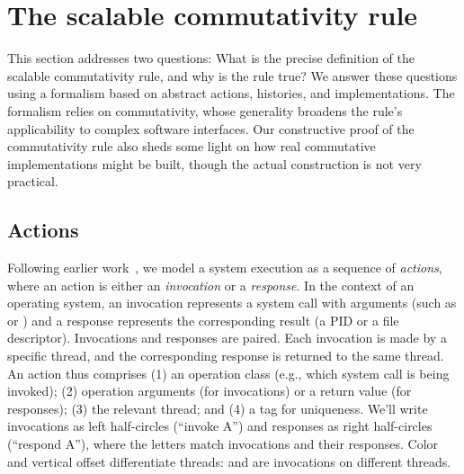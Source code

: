 
\section{The scalable commutativity rule}
\label{sec:rule}

This section addresses two questions: What is the precise
definition of the scalable commutativity rule, and why is the rule true?
%
We answer these questions using a formalism based on abstract actions, histories,
and implementations.
%
The formalism relies on \SIM commutativity, whose generality broadens
the rule's applicability to complex software interfaces.
%
Our constructive proof of the commutativity rule
also sheds some light on how real commutative implementations might be
built, though the actual construction is not very practical.



\subsection{Actions}

Following earlier work~\cite{herlihy:linearizability}, 
we model a system execution
as a sequence of \emph{actions}, where an action is either an
\emph{invocation} or a \emph{response}.
%
In the context of an operating system, an invocation represents a system
call with arguments (such as  or ) and a
response represents the corresponding result (a PID or a file
descriptor).
%
Invocations and responses are paired. Each invocation is made by a
specific thread, and the corresponding response is returned to the same
thread.
%
An action thus comprises (1) an operation class (e.g., which system
call is being invoked); (2) operation arguments (for invocations) or
a return value (for responses); (3) the relevant thread;
and (4) a tag for uniqueness.
%
We'll write invocations as left half-circles 
(``invoke A'') and responses as right half-circles
 (``respond A''), where the letters match
invocations and their responses.
%
Color and vertical offset differentiate threads:
 and  are invocations on
different threads.

\def\historyexample{%
\scpi{A}{1}
\scpi{B}{3}
\scpi{C}{2}
\scpr{A}{1}
\scpr{C}{2}
\scpr{B}{3}
\scpi{D}{1}
\scpr{D}{1}
\scpi{E}{3}
\scpr{E}{3}
\scpi{F}{2}
\scpi{G}{3}
\scpi{H}{1}
\scpr{F}{2}
\scpr{H}{1}
\scpr{G}{3}}

